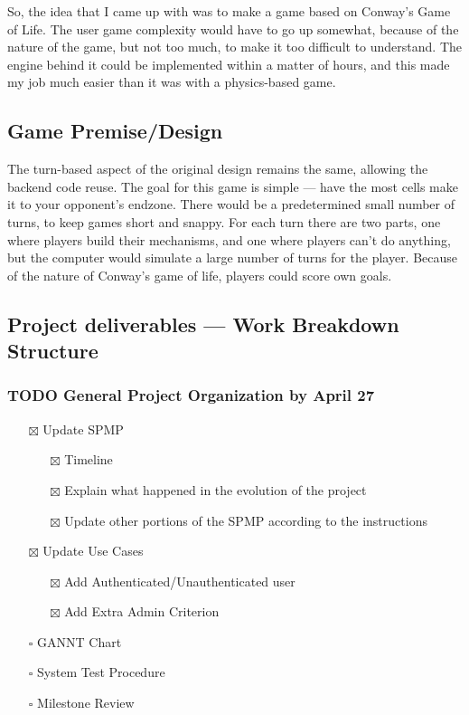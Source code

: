 \documentclass[11pt]{article}
\begin{document}
So, the idea that I came up with was to make a game based on Conway's Game of Life. The user game complexity would
have to go up somewhat, because of the nature of the game, but not too much, to make it too difficult to understand.
The engine behind it could be implemented within a matter of hours, and this made my job much easier than it was with
a physics-based game.

\subsection{Game Premise/Design}
\label{sec:orgd0c5e4a}
The turn-based aspect of the original design remains the same, allowing the backend code reuse. The goal for this game
is simple --- have the most cells make it to your opponent's endzone. There would be a predetermined small number of
turns, to keep games short and snappy. For each turn there are two parts, one where players build their mechanisms,
and one where players can't do anything, but the computer would simulate a large number of turns for the player.
Because of the nature of Conway's game of life, players could score own goals.

\subsection{Project deliverables --- Work Breakdown Structure}
\label{sec:orgec903cb}
\subsubsection{{\bfseries\sffamily TODO} General Project Organization by April 27}
\label{sec:orgb6dd73f}
\begin{itemize}
\item[{$\boxtimes$}] Update SPMP
\begin{itemize}
\item[{$\boxtimes$}] Timeline
\item[{$\boxtimes$}] Explain what happened in the evolution of the project
\item[{$\boxtimes$}] Update other portions of the SPMP according to the instructions
\end{itemize}
\item[{$\boxtimes$}] Update Use Cases
\begin{itemize}
\item[{$\boxtimes$}] Add Authenticated/Unauthenticated user
\item[{$\boxtimes$}] Add Extra Admin Criterion
\end{itemize}
\item[{$\square$}] GANNT Chart
\item[{$\square$}] System Test Procedure
\item[{$\square$}] Milestone Review
\end{itemize}
\end{document}
